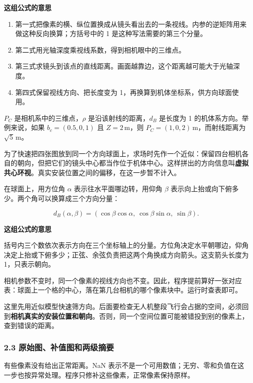 \documentclass[12pt,a4paper]{article}
\numberwithin{equation}{topic}
\begin{document}
\noindent\textbf{这组公式的意思}\par\nobreak
\begin{enumerate}
\item 第一式把像素的横、纵位置换成从镜头看出去的一条视线。内参的逆矩阵用来做这种反向换算；方括号中的 1 是这种写法需要的第三个分量。
\item 第二式用光轴深度乘视线系数，得到相机眼中的三维点。
\item 第三式求镜头到该点的直线距离。画面越靠边，这个距离越可能大于光轴深度。
\item 第四式保留视线方向、把长度变为 1，再换算到机体坐标系，供方向球面使用。
\end{enumerate}


\(P_C\) 是相机系中的三维点，\(\rho\) 是沿该射线的距离，\(d_B\) 是长度为 1 的机体系方向。举例来说，如果 \(b_c=(0.5,0,1)\) 且 \(Z=2\,\mathrm m\)，则 \(P_C=(1,0,2)\,\mathrm m\)，而射线距离为 \(\sqrt5\,\mathrm m\)。

为了快速把四张图放到同一个方向球面上，求场时先作一个近似：保留四台相机各自的朝向，但把它们的镜头中心都当作位于机体中心。这样拼出的方向信息叫\textbf{虚拟共心环视}。真实安装位置之间的偏移，在这一步暂不计入。

在球面上，用方位角 \(\alpha\) 表示往水平面哪边转，用仰角 \(\beta\) 表示向上抬或向下俯多少。两个角可以换算成三个方向分量：

\begin{equation}
\label{eq:sphere}
d_B(\alpha,\beta)=
(\cos\beta\cos\alpha,\ \cos\beta\sin\alpha,\ \sin\beta).
\end{equation}

\noindent\textbf{这组公式的意思}\par\nobreak
括号内三个数依次表示方向在三个坐标轴上的分量。方位角决定水平朝哪边，仰角决定上抬或下俯多少；正弦、余弦负责把这两个角换成方向箭头。这支箭头长度为 1，只表示朝向。


相机参数不变时，同一个像素的视线方向也不变。因此，程序提前算好一张对应表：球面上一个格的中心，落在第几台相机的哪个像素块中。运行时查表即可。

这里先用近似模型快速筛方向。后面要检查无人机整段飞行会占据的空间，必须回到\textbf{相机真实的安装位置和朝向}。否则，同一个空间位置可能被错投到别的像素上，查到错误的距离。

\subsubsection*{2.3 原始图、补值图和两级摘要}

有些像素没有给出正常距离。NaN 表示不是一个可用数值；无穷、零和负值在这一步也按异常处理。程序只修补这些像素，正常像素保持原样。
\end{document}
